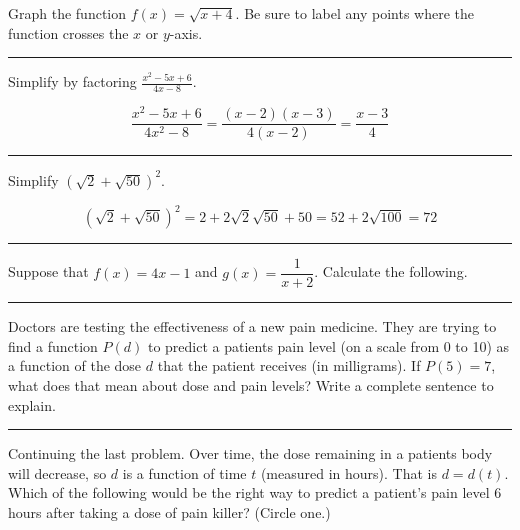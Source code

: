 \documentclass[10pt]{exam}
\newcommand{\ds}{\displaystyle}
\begin{document}
\begin{questions}
\question Graph the function $f(x) = \ds \sqrt{x+4}$. Be sure to label any points where the function crosses the $x$ or $y$-axis.
\begin{flushright}
\end{flushright}
\begin{solution}
\end{solution}
\vfill
\hrule


\question Simplify by factoring $\ds \frac{x^2-5x+6}{4x-8}$.
\begin{solution}
$$\frac{x^2-5x+6}{4x^2-8} = \frac{(x-2)(x-3)}{4(x-2)} = \frac{x-3}{4}$$
\end{solution}
\vfill
\vfill
\vfill
\hrule

\question Simplify $(\sqrt{2} + \sqrt{50})^2$. 
\begin{solution}
$$(\sqrt{2}+\sqrt{50})^2 = 2 + 2 \sqrt{2}\sqrt{50} + 50 = 52 + 2 \sqrt{100} = 72$$
\end{solution}
\vfill
\vfill
\vfill
\hrule

\newpage
\question Suppose that $f(x) = 4x-1$ and $g(x) = \dfrac{1}{x+2}$.  Calculate the following.
\begin{solution}
\end{solution}
\hrule


\question Doctors are testing the effectiveness of a new pain medicine.  They are trying to find a function $P(d)$ to predict a patients pain level (on a scale from 0 to 10) as a function of the dose $d$ that the patient receives (in milligrams).  If $P(5) = 7$, what does that mean about dose and pain levels? Write a complete sentence to explain. 
\vfill
\vfill
\hrule

\question Continuing the last problem.  Over time, the dose remaining in a patients body will decrease, so $d$ is a function of time $t$ (measured in hours).  That is $d = d(t)$. Which of the following would be the right way to predict a patient's pain level 6 hours after taking a dose of pain killer?  (Circle one.) \\


\end{questions}
\end{document}
